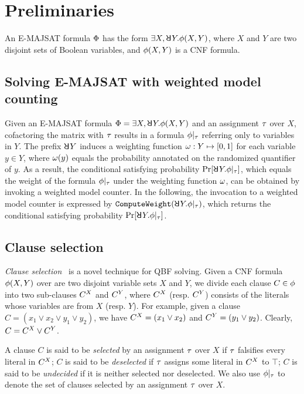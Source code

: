\section{Preliminaries}
\label{sect:erssat-preliminaries}

An E-MAJSAT formula $\Phi$ has the form $\exists X,\random{} Y.\pf(X,Y)$,
where $X$ and $Y$ are two disjoint sets of Boolean variables,
and $\phi(X,Y)$ is a CNF formula.

\subsection{Solving E-MAJSAT with weighted model counting}
Given an E-MAJSAT formula $\Qf=\exists X,\random{} Y.\pf(X,Y)$ and an assignment $\tau$ over $X$,
cofactoring the matrix with $\tau$ results in a formula $\phi|_{\tau}$ referring only to variables in $Y$.
The prefix $\random{} Y$ induces a weighting function $\omega: Y \mapsto [0,1]$ for each variable $y \in Y$,
where $\omega(y)$ equals the probability annotated on the randomized quantifier of $y$.
As a result, the conditional satisfying probability $\spb{\random{} Y.\pcf{\pf}{\as}}$,
which equals the weight of the formula $\phi|_{\tau}$ under the weighting function $\omega$,
can be obtained by invoking a weighted model counter.
In the following,
the invocation to a weighted model counter is expressed by $\texttt{ComputeWeight}(\random{} Y.\pcf{\pf}{\as})$, which returns the conditional satisfying probability $\spb{\random{} Y.\pcf{\pf}{\as}}$.

\subsection{Clause selection}
\label{sect:erssat-clause-select}

\textit{Clause selection}~\cite{Janota2015,Rabe2015} is a novel technique for QBF solving.
Given a CNF formula $\phi(X,Y)$ over are two disjoint variable sets $X$ and $Y$,
we divide each clause $C\in\phi$ into two sub-clauses $C^X$ and $C^Y$,
where $C^X$ (resp. $C^Y$) consists of the literals whose variables are from $X$ (resp. $Y$).
For example, given a clause $C=(x_1 \lor x_2 \lor y_1 \lor y_2)$,
we have $C^X=(x_1 \lor x_2)$ and $C^Y=(y_1 \lor y_2)$.
Clearly, $C=C^X\lor C^Y$.

A clause $C$ is said to be \textit{selected} by an assignment $\tau$ over $X$ if $\tau$ falsifies every literal in $C^X$;
$C$ is said to be \textit{deselected} if $\tau$ assigns some literal in $C^X$ to $\top$;
$C$ is said to be \textit{undecided} if it is neither selected nor deselected.
We also use $\phi|_{\tau}$ to denote the set of clauses selected by an assignment $\tau$ over $X$.

